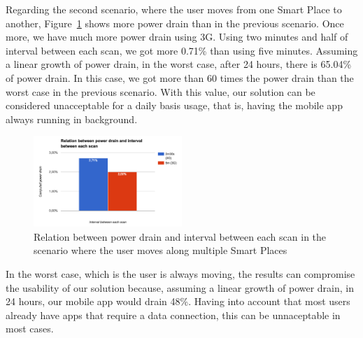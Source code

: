 Regarding the second scenario, where the user moves from one Smart Place to another, Figure~\ref{fig:results_battery_walking} shows more power drain than in the previous scenario.
Once more, we have much more power drain using \gls{3G}.
Using two minutes and half of interval between each scan, we got more 0.71\% than using five minutes.
Assuming a linear growth of power drain, in the worst case, after 24 hours, there is 65.04\% of power drain.
In this case, we got more than 60 times the power drain than the worst case in the previous scenario.
With this value, our solution can be considered unacceptable for a daily basis usage, that is, having the mobile app always running in background.

\begin{figure}[!ht]
  \centering
    \includegraphics[width=0.5\textwidth, keepaspectratio]{figures/results_battery_walking}
    \caption[Power drain when the user is moving]{Relation between power drain and interval between each scan in the scenario where the user moves along multiple Smart Places}
    \label{fig:results_battery_walking}
\end{figure}

In the worst case, which is the user is always moving, the results can compromise the usability of our solution because, assuming a linear growth of power drain, in 24 hours, our mobile app would drain 48\%.
Having into account that most users already have apps that require a data connection, this can be unnaceptable in most cases.
